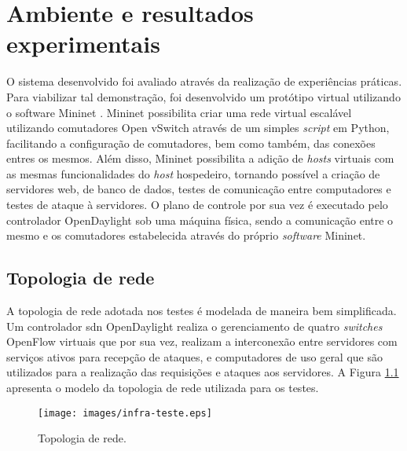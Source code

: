 
\chapter{Ambiente e resultados experimentais}
\label{cap:testes}


O sistema desenvolvido foi avaliado através da realização de experiências práticas.
Para viabilizar tal demonstração, foi desenvolvido um protótipo virtual utilizando o software Mininet \cite{website:mininet}. Mininet possibilita criar uma rede virtual escalável utilizando comutadores Open vSwitch \cite{Pfaff:2009} através de um simples \textit{script} em Python\cite{Python:2017}, facilitando a configuração de comutadores, bem como também, das conexões entres os mesmos. Além disso, Mininet possibilita a adição de \textit{hosts} virtuais com as mesmas funcionalidades do \textit{host} hospedeiro, tornando possível a criação de servidores \gls{web}, de banco de dados, testes de comunicação entre computadores e testes de ataque à servidores.
O plano de controle por sua vez é executado pelo controlador OpenDaylight \cite{website:odl} sob uma máquina física, sendo a comunicação entre o mesmo e os comutadores estabelecida através do próprio \textit{software} Mininet.


\section{Topologia de rede}

A topologia de rede adotada nos testes é modelada de maneira bem simplificada. 
Um controlador \gls{sdn} OpenDaylight realiza o gerenciamento de quatro \textit{switches} OpenFlow virtuais que por sua vez, realizam a interconexão entre servidores com serviços ativos para recepção de ataques, e computadores de uso geral que são utilizados para a realização das requisições e ataques aos servidores. A Figura \ref{fig:infra-testes} apresenta o modelo da topologia de rede utilizada para os testes.

\begin{figure}[H]
  \centering
  \caption{Topologia de rede.}
  \texttt{[image: images/infra-teste.eps]}
  \label{fig:infra-testes}
\end{figure}

